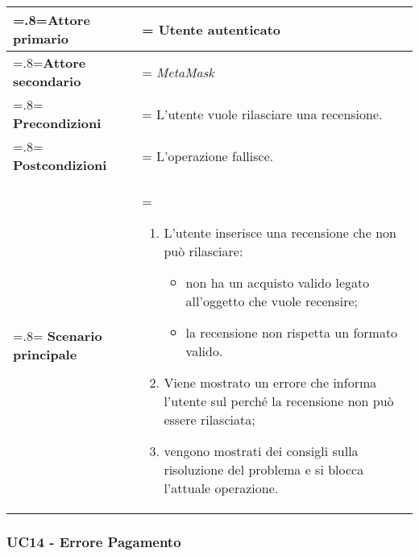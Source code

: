             \begin{center}
                \renewcommand{\arraystretch}{1.5}
                \renewcommand\tabularxcolumn[1]{m{#1}}
                \begin{tabularx}{0.9\textwidth} {
                    >{\hsize=.8\hsize\linewidth=\hsize}X
                    >{\hsize=1.2\hsize\linewidth=\hsize}X}
                    \hline
                    \textbf{Attore primario} & Utente autenticato \\
                    \hline
                    \textbf{Attore secondario} & \textit{MetaMask} \\
                    \hline
                    \textbf{Precondizioni} & L'utente vuole rilasciare una recensione. \\
                    \hline
                    \textbf{Postcondizioni} & L'operazione fallisce. \\
                    \hline
                    \textbf{Scenario principale} &
                        \begin{enumerate}
                            \item L'utente inserisce una recensione che non può rilasciare:
                            \begin{itemize}
                            \item non ha un acquisto valido legato all'oggetto che vuole recensire;
                            \item la recensione non rispetta un formato valido.
                            \end{itemize}
                            \item Viene mostrato un errore che informa l'utente sul perché la recensione non può
                            essere rilasciata;
                            \item vengono mostrati dei consigli sulla risoluzione del problema e si blocca
                            l'attuale operazione.
                        \end{enumerate} \\
                    \hline
                \end{tabularx}
            \end{center}

        \subsubsection{UC14 - Errore Pagamento}
        \label{UC14}

